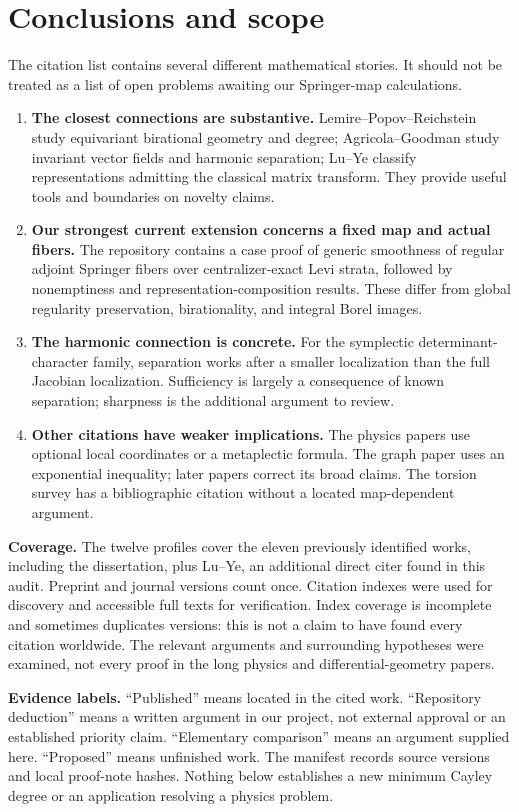 \documentclass[11pt,letterpaper]{article}
\begin{document}
\section{Conclusions and scope}
The citation list contains several different mathematical stories. It should not be treated as a list of open problems awaiting our Springer-map calculations.
\begin{enumerate}
\item \textbf{The closest connections are substantive.} Lemire--Popov--Reichstein study equivariant birational geometry and degree; Agricola--Goodman study invariant vector fields and harmonic separation; Lu--Ye classify representations admitting the classical matrix transform. They provide useful tools and boundaries on novelty claims.
\item \textbf{Our strongest current extension concerns a fixed map and actual fibers.} The repository contains a case proof of generic smoothness of regular adjoint Springer fibers over centralizer-exact Levi strata, followed by nonemptiness and representation-composition results. These differ from global regularity preservation, birationality, and integral Borel images.
\item \textbf{The harmonic connection is concrete.} For the symplectic determinant-character family, separation works after a smaller localization than the full Jacobian localization. Sufficiency is largely a consequence of known separation; sharpness is the additional argument to review.
\item \textbf{Other citations have weaker implications.} The physics papers use optional local coordinates or a metaplectic formula. The graph paper uses an exponential inequality; later papers correct its broad claims. The torsion survey has a bibliographic citation without a located map-dependent argument.
\end{enumerate}
\textbf{Coverage.} The twelve profiles cover the eleven previously identified works, including the dissertation, plus Lu--Ye, an additional direct citer found in this audit. Preprint and journal versions count once. Citation indexes were used for discovery and accessible full texts for verification. Index coverage is incomplete and sometimes duplicates versions: this is not a claim to have found every citation worldwide. The relevant arguments and surrounding hypotheses were examined, not every proof in the long physics and differential-geometry papers.

\textbf{Evidence labels.} ``Published'' means located in the cited work. ``Repository deduction'' means a written argument in our project, not external approval or an established priority claim. ``Elementary comparison'' means an argument supplied here. ``Proposed'' means unfinished work. The manifest records source versions and local proof-note hashes. Nothing below establishes a new minimum Cayley degree or an application resolving a physics problem.
{\small\setlength{\parskip}{0pt}\tableofcontents}\newpage




\end{document}
